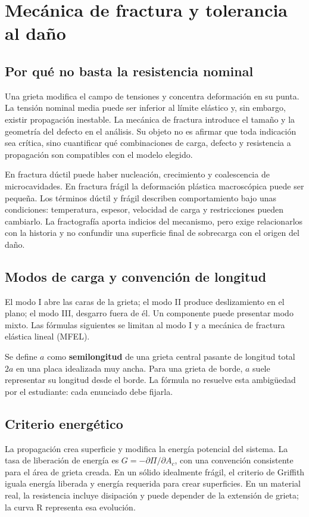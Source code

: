 \chapter{Mecánica de fractura y tolerancia al daño}\label{ch:03}
\section{Por qué no basta la resistencia nominal}
Una grieta modifica el campo de tensiones y concentra deformación en su punta. La tensión nominal media puede ser inferior al límite elástico y, sin embargo, existir propagación inestable. La mecánica de fractura introduce el tamaño y la geometría del defecto en el análisis. Su objeto no es afirmar que toda indicación sea crítica, sino cuantificar qué combinaciones de carga, defecto y resistencia a propagación son compatibles con el modelo elegido.

En fractura dúctil puede haber nucleación, crecimiento y coalescencia de microcavidades. En fractura frágil la deformación plástica macroscópica puede ser pequeña. Los términos dúctil y frágil describen comportamiento bajo unas condiciones: temperatura, espesor, velocidad de carga y restricciones pueden cambiarlo. La fractografía aporta indicios del mecanismo, pero exige relacionarlos con la historia y no confundir una superficie final de sobrecarga con el origen del daño.
\section{Modos de carga y convención de longitud}
El modo I abre las caras de la grieta; el modo II produce deslizamiento en el plano; el modo III, desgarro fuera de él. Un componente puede presentar modo mixto. Las fórmulas siguientes se limitan al modo I y a mecánica de fractura elástica lineal (MFEL).

Se define $a$ como \textbf{semilongitud} de una grieta central pasante de longitud total $2a$ en una placa idealizada muy ancha. Para una grieta de borde, $a$ suele representar su longitud desde el borde. La fórmula no resuelve esta ambigüedad por el estudiante: cada enunciado debe fijarla.
\section{Criterio energético}
La propagación crea superficie y modifica la energía potencial del sistema. La tasa de liberación de energía es $G=-\partial\Pi/\partial A_c$, con una convención consistente para el área de grieta creada. En un sólido idealmente frágil, el criterio de Griffith iguala energía liberada y energía requerida para crear superficies. En un material real, la resistencia incluye disipación y puede depender de la extensión de grieta; la curva R representa esa evolución.


